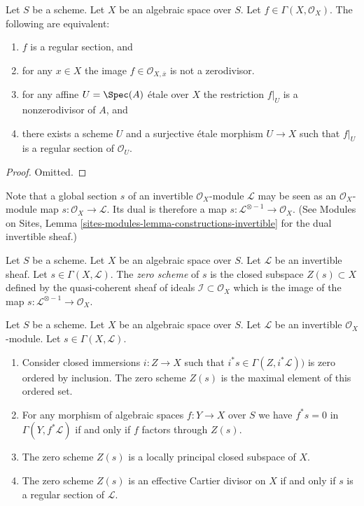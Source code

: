 \begin{lemma}
\label{lemma-regular-section-structure-sheaf}
Let $S$ be a scheme.
Let $X$ be an algebraic space over $S$.
Let $f \in \Gamma(X, \mathcal{O}_X)$.
The following are equivalent:
\begin{enumerate}
\item $f$ is a regular section, and
\item for any $x \in X$ the image $f \in \mathcal{O}_{X, \overline{x}}$
is not a zerodivisor.
\item for any affine $U = \Spec(A)$ \'etale over $X$
the restriction $f|_U$ is a nonzerodivisor of $A$, and
\item there exists a scheme $U$ and a surjective \'etale morphism
$U \to X$ such that $f|_U$ is a regular section of $\mathcal{O}_U$.
\end{enumerate}
\end{lemma}

\begin{proof}
Omitted.
\end{proof}

\noindent
Note that a global section $s$ of an invertible $\mathcal{O}_X$-module
$\mathcal{L}$ may be seen as an $\mathcal{O}_X$-module map
$s : \mathcal{O}_X \to \mathcal{L}$. Its dual is therefore a
map $s : \mathcal{L}^{\otimes -1} \to \mathcal{O}_X$.
(See Modules on Sites, Lemma \ref{sites-modules-lemma-constructions-invertible}
for the dual invertible sheaf.)

\begin{definition}
\label{definition-zero-scheme-s}
Let $S$ be a scheme. Let $X$ be an algebraic space over $S$.
Let $\mathcal{L}$ be an invertible sheaf.
Let $s \in \Gamma(X, \mathcal{L})$.
The {\it zero scheme} of $s$ is the closed subspace $Z(s) \subset X$
defined by the quasi-coherent sheaf of ideals
$\mathcal{I} \subset \mathcal{O}_X$ which is the image of the
map $s : \mathcal{L}^{\otimes -1} \to \mathcal{O}_X$.
\end{definition}

\begin{lemma}
\label{lemma-zero-scheme}
Let $S$ be a scheme. Let $X$ be an algebraic space over $S$.
Let $\mathcal{L}$ be an invertible $\mathcal{O}_X$-module.
Let $s \in \Gamma(X, \mathcal{L})$.
\begin{enumerate}
\item Consider closed immersions $i : Z \to X$ such that
$i^*s \in \Gamma(Z, i^*\mathcal{L}))$ is zero
ordered by inclusion. The zero scheme $Z(s)$ is the
maximal element of this ordered set.
\item For any morphism of algebraic spaces $f : Y \to X$ over $S$
we have $f^*s = 0$ in $\Gamma(Y, f^*\mathcal{L})$ if and only if
$f$ factors through $Z(s)$.
\item The zero scheme $Z(s)$ is a locally principal closed subspace of $X$.
\item The zero scheme $Z(s)$ is an effective Cartier divisor on $X$
if and only if $s$ is a regular section of $\mathcal{L}$.
\end{enumerate}
\end{lemma}

